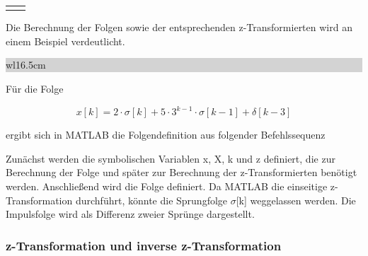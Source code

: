 \begin{table}[H]
{\begin{tabular}{| c | c |}
\parbox[c][0.4in][c]{1.5in}{} & 
\parbox[c][0.4in][c]{5in}{}\\ \hline

\parbox[c][0.6in][c]{1.5in}{} & 
\parbox[c][0.6in][c]{5in}{}\\ \hline

\end{tabular}%
}
\label{tab:fiveseven}
\end{table}

\noindent Die Berechnung der Folgen sowie der entsprechenden z-Transformierten wird an einem Beispiel verdeutlicht.

\clearpage 

\noindent
\colorbox{lightgray}{%
%
\renewcommand\arraystretch{0.6}%
\begin{tabular}{ wl{16.5cm} }
{\selectfont{Beispiel: Folgendefinition}}
\end{tabular}%
}\medskip

\noindent Für die Folge 

\begin{equation}\label{eq:fiveonehundredtwentythree}
x\left[k\right]=2\cdot \sigma \left[k\right]+5\cdot 3^{k-1} \cdot \sigma \left[k-1\right]+\delta \left[k-3\right]
\end{equation}

\noindent ergibt sich in MATLAB die Folgendefinition aus folgender Befehlssequenz



\noindent Zun\"{a}chst werden die symbolischen Variablen x, X, k und z definiert, die zur Berechnung der Folge und sp\"{a}ter zur Berechnung der z-Transformierten ben\"{o}tigt werden. Anschlie{\ss}end wird die Folge definiert. Da MATLAB die einseitige z-Transformation durchf\"{u}hrt, k\"{o}nnte die Sprungfolge $\sigma$[k] weggelassen werden. Die Impulsfolge wird als Differenz zweier Spr\"{u}nge dargestellt. 

\subsubsection{z-Transformation und inverse z-Transformation}


